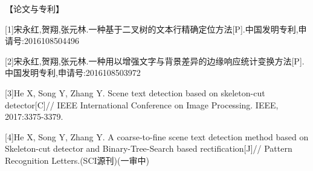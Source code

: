﻿%
%
%
%
%
%
【论文与专利】

[1]宋永红,贺翔,张元林.一种基于二叉树的文本行精确定位方法[P].中国发明专利,申请号:2016108504496

[2]宋永红,贺翔,张元林.一种用以增强文字与背景差异的边缘响应统计变换方法[P].中国发明专利,申请号:2016108503972

[3]He X, Song Y, Zhang Y. Scene text detection based on skeleton-cut detector[C]// IEEE International Conference on Image Processing. IEEE, 2017:3375-3379.

[4]He X, Song Y, Zhang Y. A coarse-to-fine scene text detection method based on Skeleton-cut detector and Binary-Tree-Search based rectification[J]// Pattern Recognition Letters.(SCI源刊)(一审中)









